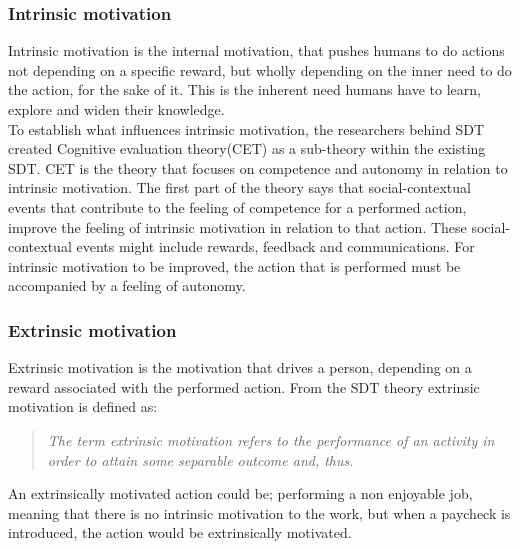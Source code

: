 \subsubsection*{Intrinsic motivation}
Intrinsic motivation is the internal motivation, that pushes humans to do actions not depending on a specific reward, but wholly depending on the inner need to do the action, for the sake of it\cite{SDT}.
This is the inherent need humans have to learn, explore and widen their knowledge\cite{SDT}.\\

To establish what influences intrinsic motivation, the researchers behind SDT\cite{SDT} created Cognitive evaluation theory(CET) as a sub-theory within the existing SDT. CET is the theory that focuses on competence and autonomy in relation to intrinsic motivation. The first part of the theory says that social-contextual events that contribute to the feeling of competence for a performed action, improve the feeling of intrinsic motivation in relation to that action\cite[p.~70]{SDT}. These social-contextual events might include rewards, feedback and communications\cite[p.~70]{SDT}. For intrinsic motivation to be improved, the action that is performed must be accompanied by a feeling of autonomy\cite[p.~70]{SDT}.

\subsubsection*{Extrinsic motivation}
Extrinsic motivation is the motivation that drives a person, depending on a reward associated with the performed action. From the SDT theory extrinsic motivation is defined as: 
\begin{quote}
	\textit{The term extrinsic motivation refers to the performance of an activity in order to attain some separable outcome and, thus}\cite[p.~71]{SDT}.\\
\end{quote}
An extrinsically motivated action could be; performing a non enjoyable job, meaning that there is no intrinsic motivation to the work, but when a paycheck is introduced, the action would be extrinsically motivated.

